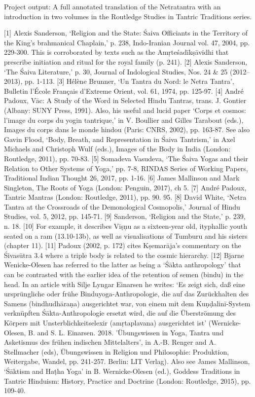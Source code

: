 {Project output:
A full annotated translation of the Netratantra with an introduction in two volumes in the Routledge Studies in Tantric Traditions series.

[1] Alexis Sanderson, ‘Religion and the State: Śaiva Officiants in the Territory of the King’s brahmanical Chaplain,’ p. 238, Indo-Iranian Journal vol. 47, 2004, pp. 229-300. This is corroborated by texts such as the Amṛteśadīkṣāvidhi that prescribe initiation and ritual for the royal family (p. 241).
[2] Alexis Sanderson, ‘The Śaiva Literature,’ p. 30, Journal of Indological Studies, Nos. 24 \& 25 (2012–2013), pp. 1-113.
[3] Hélène Brunner, ‘Un Tantra du Nord: le Netra Tantra’, Bulletin l’École Français d’Extreme Orient, vol. 61, 1974, pp. 125-97.
[4] André Padoux, Vāc: A Study of the Word in Selected Hindu Tantras, trans. J. Gontier (Albany: SUNY Press, 1991). Also, his useful and lucid paper ‘Corps et cosmos: l’image du corps du yogin tantrique,’ in V. Boullier and Gilles Tarabout (eds.), Images du corps dans le monde hindou (Paris: CNRS, 2002), pp. 163-87. See also Gavin Flood, ‘Body, Breath, and Representation in Śaiva Tantrism,’ in Axel Michaels and Christoph Wulf (eds.), Images of the Body in India (London: Routledge, 2011), pp. 70-83.
[5] Somadeva Vasudeva, ‘The Śaiva Yogas and their Relation to Other Systems of Yoga,’ pp. 7-8, RINDAS Series of Working Papers, Traditional Indian Thought 26, 2017, pp. 1-16.
[6] James Mallinson and Mark Singleton, The Roots of Yoga (London: Penguin, 2017), ch 5.
[7] André Padoux, Tantric Mantras (London: Routledge, 2011), pp. 90. 95.
[8] David White, ‘Netra Tantra at the Crossroads of the Demonological Cosmopolis,’ Journal of Hindu Studies, vol. 5, 2012, pp. 145-71.
[9] Sanderson, ‘Religion and the State,’ p. 239, n. 18.
[10] For example, it describes Viṣṇu as a sixteen-year old, ityphallic youth seated on a ram (13.10-13b), as well as visualisations of Tumburu and his sisters (chapter 11).
[11] Padoux (2002, p. 172) cites Kṣemarāja’s commentary on the Śivasūtra 3.4 where a triple body is related to the cosmic hierarchy.
[12] Bjarne Wenicke-Olesen has referred to the latter as being a ‘Śākta anthropology’ that can be contrasted with the earlier idea of the retention of semen (bindu) in the head. In an article with Silje Lyngar Einarsen he writes: ‘Es zeigt sich, daß eine ursprüngliche oder frühe Binduyoga-Anthropologie, die auf das Zurückhalten des Samens (bindhudhāraṇa) ausgerichtet war, von einem mit dem Kuṇḍalinī-System verknüpften Śākta-Anthropologie ersetzt wird, die auf die Überströmung des Körpers mit Unsterblichkeitselexir (amṛtaplavana) ausgerichtet ist’ (Wernicke-Olesen, B. and S. L. Einarsen. 2018. ’Übungswissen in Yoga, Tantra und Asketismus des frühen indischen Mittelalters’, in A.-B. Renger and A. Stellmacher (eds), Übungswissen in Religion und Philosophie: Produktion, Weitergabe, Wandel, pp. 241-257. Berlin: LIT Verlag). Also see James Mallinson, ‘Śāktism and Haṭha Yoga’ in B. Wernicke-Olesen (ed.), Goddess Traditions in Tantric Hinduism: History, Practice and Doctrine (London: Routledge, 2015), pp. 109-40.
}
